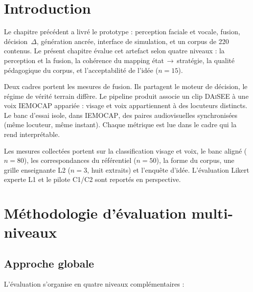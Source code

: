 \section{Introduction}
\label{sec:ch5-intro}

Le chapitre précédent a livré le prototype : perception faciale et
vocale, fusion, décision~$\Delta$, génération ancrée, interface de
simulation, et un corpus de 220 contenus. Le présent chapitre évalue
cet artefact selon quatre niveaux : la perception et la fusion, la
cohérence du mapping état\,$\rightarrow$\,stratégie, la qualité
pédagogique du corpus, et l'acceptabilité de l'idée ($n=15$).

Deux cadres portent les mesures de fusion. Ils partagent le moteur de
décision, le régime de vérité terrain diffère. Le pipeline produit
associe un clip \textsc{DAiSEE} à une voix \textsc{IEMOCAP} appariée :
visage et voix appartiennent à des locuteurs distincts. Le banc d'essai
isole, dans \textsc{IEMOCAP}, des paires audiovisuelles synchronisées
(même locuteur, même instant). Chaque métrique est lue dans le cadre qui
la rend interprétable.

Les mesures collectées portent sur la classification visage et voix, le
banc aligné ($n=80$), les correspondances du référentiel ($n=50$), la
forme du corpus, une grille enseignante L2 ($n=3$, huit extraits) et
l'enquête d'idée. L'évaluation Likert experte L1 et le pilote C1/C2 sont
reportés en perspective.

\section{Méthodologie d'évaluation multi-niveaux}
\label{sec:val-methodo}

\subsection{Approche globale}

L'évaluation s'organise en quatre niveaux complémentaires :

